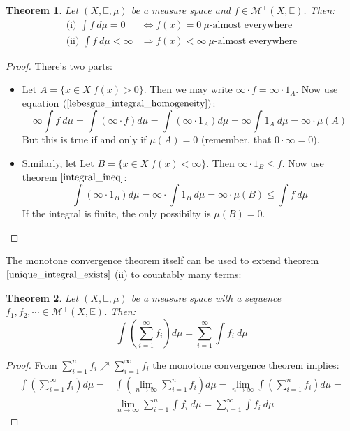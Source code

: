 \documentclass[12pt, a4paper]{article}
\newtheorem{theorem}{Theorem}[section]
\numberwithin{equation}{section}
\begin{document}
\begin{theorem}
\label{zero_infty_ae}
Let $(X,\mathbb{E},\mu)$ be a measure space and $f\in\mathcal{M}^+(X,\mathbb{E})$. Then:
\begin{align}
\textrm{(i) }\int f\ d\mu =0&\Leftrightarrow f(x)=0\ \mu\textrm{-almost everywhere} \\
\textrm{(ii) }\int f\ d\mu <\infty&\Rightarrow f(x)<\infty\ \mu\textrm{-almost everywhere}
\end{align}
\end{theorem}
\begin{proof}
There's two parts:
\begin{itemize}
\item Let $A=\{x\in X|f(x)>0\}$. Then we may write $\infty\cdot f=\infty\cdot 1_A$. Now use equation $(\ref{lebesgue_integral_homogeneity})$:
\begin{equation}
\infty\int f\ d\mu=\int(\infty\cdot f)d\mu=\int(\infty\cdot 1_A)d\mu=\infty\int 1_A\ d\mu=\infty\cdot\mu(A)
\end{equation}
But this is true if and only if $\mu(A)=0$ (remember, that $0\cdot\infty=0$).
\item Similarly, let Let $B=\{x\in X|f(x)<\infty\}$. Then $\infty\cdot 1_B\le f$. Now use theorem $\ref{integral_ineq}$:
\begin{equation}
\int(\infty\cdot 1_B)d\mu=\infty\cdot\int 1_B\ d\mu=\infty\cdot\mu(B)\le\int f\ d\mu
\end{equation}
If the integral is finite, the only possibilty is $\mu(B)=0$.
\end{itemize}
\end{proof}

The monotone convergence theorem itself can be used to extend theorem $\ref{unique_integral_exists}$ (ii) to countably many terms:

\begin{theorem}
\label{exchange_int_sum}
Let $(X,\mathbb{E},\mu)$ be a measure space with a sequence $f_1,f_2,\cdots\in\mathcal{M}^+(X,\mathbb{E})$. Then:
\begin{equation}
\int\left(\sum_{i=1}^\infty f_i\right)d\mu=\sum_{i=1}^\infty\int f_i\ d\mu
\end{equation}
\end{theorem}
\begin{proof}
From $\sum_{i=1}^n f_i\nearrow\sum_{i=1}^\infty f_i$ the monotone convergence theorem implies:
\begin{align}
\int\left(\sum_{i=1}^\infty f_i\right)d\mu=&\int\left(\lim_{n\rightarrow\infty}\sum_{i=1}^n f_i\right)d\mu=\lim_{n\rightarrow\infty}\int\left(\sum_{i=1}^n f_i\right)d\mu=\\
&\lim_{n\rightarrow\infty}\sum_{i=1}^n\int f_i\ d\mu=\sum_{i=1}^\infty\int f_i\ d\mu
\end{align}
\end{proof}
\end{document}
